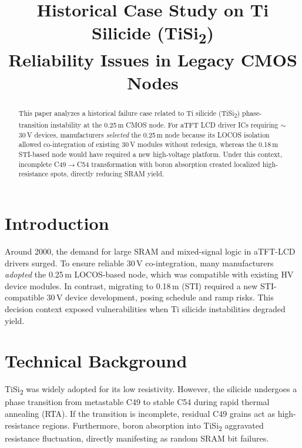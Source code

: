 \documentclass[conference]{IEEEtran}
\begin{document}
\title{Historical Case Study on Ti Silicide (TiSi\textsubscript{2}) \\ 
Reliability Issues in Legacy CMOS Nodes}

\author{
}

\maketitle

\begin{abstract}
This paper analyzes a historical failure case related to Ti silicide (TiSi\textsubscript{2}) phase-transition instability at the 0.25\,\textmu m CMOS node.
For aTFT LCD driver ICs requiring $\sim$30\,V devices, manufacturers \emph{selected} the 0.25\,\textmu m node because its LOCOS isolation allowed co-integration of existing 30\,V modules without redesign, whereas the 0.18\,\textmu m STI-based node would have required a new high-voltage platform.
Under this context, incomplete C49$\rightarrow$C54 transformation with boron absorption created localized high-resistance spots, directly reducing SRAM yield.
\end{abstract}

\section{Introduction}
Around 2000, the demand for large SRAM and mixed-signal logic in aTFT-LCD drivers surged.
To ensure reliable 30\,V co-integration, many manufacturers \emph{adopted} the 0.25\,\textmu m LOCOS-based node, which was compatible with existing HV device modules.
In contrast, migrating to 0.18\,\textmu m (STI) required a new STI-compatible 30\,V device development, posing schedule and ramp risks.
This decision context exposed vulnerabilities when Ti silicide instabilities degraded yield.

\section{Technical Background}
TiSi\textsubscript{2} was widely adopted for its low resistivity. 
However, the silicide undergoes a phase transition from metastable C49 to stable C54 during rapid thermal annealing (RTA). 
If the transition is incomplete, residual C49 grains act as high-resistance regions. 
Furthermore, boron absorption into TiSi\textsubscript{2} aggravated resistance fluctuation, directly manifesting as random SRAM bit failures.
\end{document}
